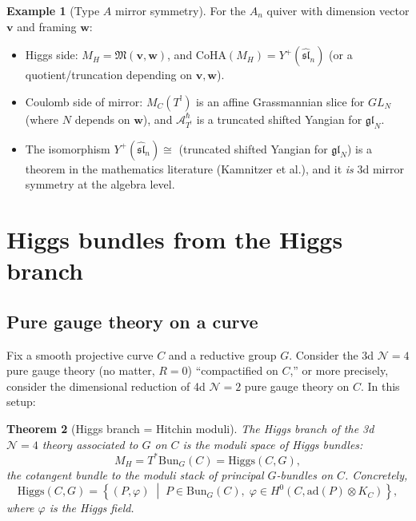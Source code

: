 \documentclass[11pt]{article}
\newtheorem{theorem}{Theorem}[section]
\theoremstyle{definition}
\newtheorem{example}[theorem]{Example}
\theoremstyle{remark}
\newcommand{\Bun}{\mathrm{Bun}}
\newcommand{\Higgs}{\mathrm{Higgs}}
\newcommand{\cN}{\mathcal{N}}
\renewcommand{\hbar}{\hslash}
\newcommand{\CoHA}{\mathrm{CoHA}}
\begin{document}
\begin{example}[Type $A$ mirror symmetry]
\label{ex:type-a-mirror}
For the $A_n$ quiver with dimension vector $\mathbf{v}$ and framing $\mathbf{w}$:
\begin{itemize}
 \item Higgs side: $M_H = \mathfrak{M}(\mathbf{v}, \mathbf{w})$, and $\CoHA(M_H) = Y^+(\widehat{\mathfrak{sl}}_n)$ (or a quotient/truncation depending on $\mathbf{v}, \mathbf{w}$).
 \item Coulomb side of mirror: $M_C(T^!)$ is an affine Grassmannian slice for $GL_N$ (where $N$ depends on $\mathbf{w}$), and $\mathcal{A}^\hbar_{T^!}$ is a truncated shifted Yangian for $\mathfrak{gl}_N$.
 \item The isomorphism $Y^+(\widehat{\mathfrak{sl}}_n) \cong$ (truncated shifted Yangian for $\mathfrak{gl}_N$) is a theorem in the mathematics literature (Kamnitzer et al.), and it \emph{is} 3d mirror symmetry at the algebra level.
\end{itemize}
\end{example}

\section{Higgs bundles from the Higgs branch}
\label{sec:higgs-bundles}

\subsection{Pure gauge theory on a curve}

Fix a smooth projective curve $C$ and a reductive group $G$. Consider the 3d $\cN=4$ pure gauge theory (no matter, $R = 0$) ``compactified on $C$,'' or more precisely, consider the dimensional reduction of 4d $\cN=2$ pure gauge theory on $C$. In this setup:

\begin{theorem}[Higgs branch = Hitchin moduli]
\label{thm:higgs-hitchin}
The Higgs branch of the 3d $\cN=4$ theory associated to $G$ on $C$ is the moduli space of Higgs bundles:
\[
 M_H = T^*\Bun_G(C) = \Higgs(C, G),
\]
the cotangent bundle to the moduli stack of principal $G$-bundles on $C$. Concretely,
\[
 \Higgs(C, G) = \left\{(P, \varphi) \;\middle|\; P \in \Bun_G(C),\; \varphi \in H^0(C, \mathrm{ad}(P) \otimes K_C)\right\},
\]
where $\varphi$ is the Higgs field.
\end{theorem}
\end{document}
